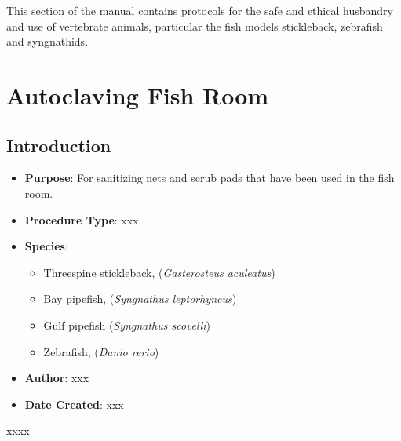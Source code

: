 \documentclass[
  letterpaper,
  DIV=11,
  numbers=noendperiod]{scrreprt}
\providecommand{\tightlist}{%
  \setlength{\itemsep}{0pt}\setlength{\parskip}{0pt}}\usepackage{longtable,booktabs,array}
\begin{document}
This section of the manual contains protocols for the safe and ethical
husbandry and use of vertebrate animals, particular the fish models
stickleback, zebrafish and syngnathids.

\hypertarget{sec-husbandry-autoclaving}{%
\chapter{Autoclaving Fish Room}\label{sec-husbandry-autoclaving}}

\hypertarget{introduction-27}{%
\section{Introduction}\label{introduction-27}}

\begin{itemize}
\tightlist
\item
  \textbf{Purpose}: For sanitizing nets and scrub pads that have been
  used in the fish room.
\item
  \textbf{Procedure Type}: xxx
\item
  \textbf{Species}:

  \begin{itemize}
  \tightlist
  \item
    Threespine stickleback, (\emph{Gasterosteus aculeatus})
  \item
    Bay pipefish, (\emph{Syngnathus leptorhyncus})
  \item
    Gulf pipefish (\emph{Syngnathus scovelli})
  \item
    Zebrafish, (\emph{Danio rerio})
  \end{itemize}
\item
  \textbf{Author}: xxx
\item
  \textbf{Date Created}: xxx
\end{itemize}

\begin{tcolorbox}[enhanced jigsaw, toprule=.15mm, breakable, coltitle=black, leftrule=.75mm, title=\textcolor{quarto-callout-warning-color}{\faExclamationTriangle}\hspace{0.5em}{NOTES}, bottomrule=.15mm, toptitle=1mm, bottomtitle=1mm, colframe=quarto-callout-warning-color-frame, opacityback=0, colback=white, opacitybacktitle=0.6, colbacktitle=quarto-callout-warning-color!10!white, rightrule=.15mm, titlerule=0mm, arc=.35mm, left=2mm]

xxxx

\end{tcolorbox}
\end{document}
